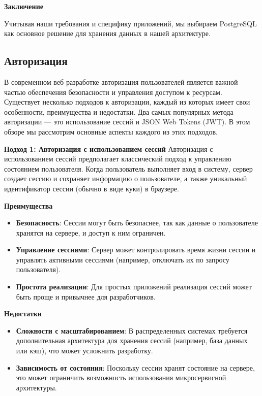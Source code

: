 \textbf{Заключение}

Учитывая наши требования и специфику приложений, мы выбираем PostgreSQL как основное решение для хранения данных в нашей архитектуре.

\subsection{Авторизация}


В современном веб-разработке авторизация пользователей является важной частью обеспечения безопасности и управления доступом к ресурсам. Существует несколько подходов к авторизации, каждый из которых имеет свои особенности, преимущества и недостатки. Два самых популярных метода авторизации — это использование сессий и JSON Web Tokens (JWT). В этом обзоре мы рассмотрим основные аспекты каждого из этих подходов.


\textbf{Подход 1: Авторизация с использованием сессий}
Авторизация с использованием сессий предполагает классический подход к управлению состоянием пользователя. 
Когда пользователь выполняет вход в систему, сервер создает сессию и сохраняет информацию о пользователе, 
а также уникальный идентификатор сессии (обычно в виде куки) в браузере.



\textbf{Преимущества}
\begin{itemize}
    \item \textbf{Безопасность}: Сессии могут быть безопаснее, так как данные о пользователе хранятся на сервере, и доступ к ним ограничен.
    \item \textbf{Управление сессиями}: Сервер может контролировать время жизни сессии и управлять активными сессиями (например, отключать их по запросу пользователя).
    \item \textbf{Простота реализации}: Для простых приложений реализация сессий может быть проще и привычнее для разработчиков.
\end{itemize}

\textbf{Недостатки}
\begin{itemize}
    \item \textbf{Сложности с масштабированием}: В распределенных системах требуется дополнительная архитектура для хранения сессий (например, база данных или кэш), что может усложнить разработку.
    \item \textbf{Зависимость от состояния}: Поскольку сессии хранят состояние на сервере, это может ограничить возможность использования микросервисной архитектуры.
\end{itemize}


